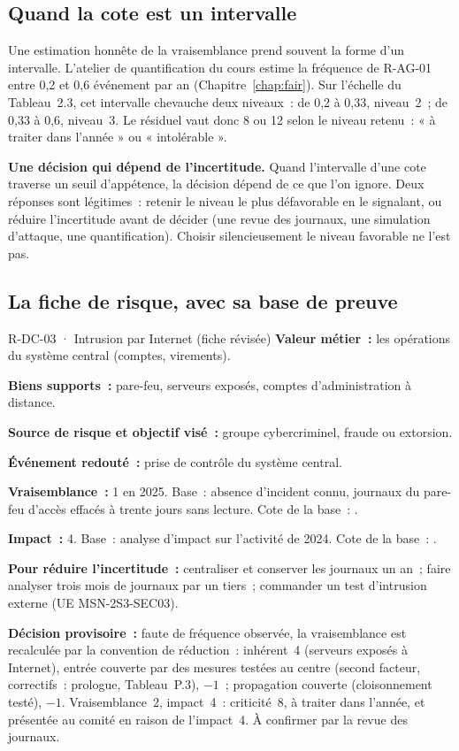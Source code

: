 \subsection{Quand la cote est un intervalle}

Une estimation honnête de la vraisemblance prend souvent la forme d'un
intervalle. L'atelier de quantification du cours estime la fréquence de
R-AG-01 entre 0,2 et 0,6 événement par an (Chapitre~\ref{chap:fair}).
Sur l'échelle du Tableau~2.3, cet intervalle chevauche deux niveaux~: de 0,2
à 0,33, niveau~2~; de 0,33 à 0,6, niveau~3. Le résiduel vaut donc 8 ou 12
selon le niveau retenu~: « à traiter dans l'année » ou « intolérable ».

\begin{boxinfo}
\textbf{Une décision qui dépend de l'incertitude.} Quand l'intervalle
d'une cote traverse un seuil d'appétence, la décision dépend de ce que
l'on ignore. Deux réponses sont légitimes~: retenir le niveau le plus
défavorable en le signalant, ou réduire l'incertitude avant de décider
(une revue des journaux, une simulation d'attaque, une quantification).
Choisir silencieusement le niveau favorable ne l'est pas.
\end{boxinfo}

\subsection{La fiche de risque, avec sa base de preuve}

\begin{boxobjet}{R-DC-03 · Intrusion par Internet (fiche révisée)}
\textbf{Valeur métier~:} les opérations du système central (comptes,
virements).

\textbf{Biens supports~:} pare-feu, serveurs exposés, comptes
d'administration à distance.

\textbf{Source de risque et objectif visé~:} groupe cybercriminel, fraude
ou extorsion.

\textbf{Événement redouté~:} prise de contrôle du système central.

\textbf{Vraisemblance~:} 1 en 2025. Base~: absence d'incident connu,
journaux du pare-feu d'accès effacés à trente jours sans lecture. Cote de
la base~: \NEK{}.

\textbf{Impact~:} 4. Base~: analyse d'impact sur l'activité de 2024. Cote
de la base~: \OUI{}.

\textbf{Pour réduire l'incertitude~:} centraliser et conserver les
journaux un an~; faire analyser trois mois de journaux par un tiers~;
commander un test d'intrusion externe (UE MSN-2S3-SEC03).

\textbf{Décision provisoire~:} faute de fréquence observée, la
vraisemblance est recalculée par la convention de réduction~: inhérent~4
(serveurs exposés à Internet), entrée couverte par des mesures testées au
centre (second facteur, correctifs~: prologue, Tableau~P.3), $-1$~;
propagation couverte (cloisonnement testé), $-1$. Vraisemblance~2,
impact~4~: criticité~8, à traiter dans l'année, et présentée au comité en
raison de l'impact~4. À confirmer par la revue des journaux.
\end{boxobjet}

